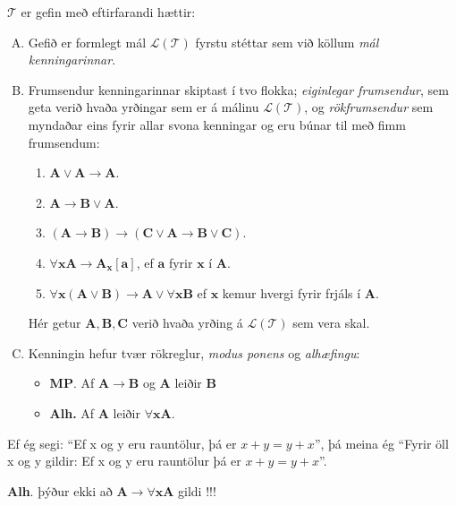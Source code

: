 \documentclass[12pt]{book}
\begin{document}
\begin{skgr} $\mathcal{T}$ er gefin með
  eftirfarandi hættir:
  \begin{enumerate}[A.]
  \item Gefið er formlegt mál $\mathcal{L(T)}$ fyrstu stéttar sem við köllum
    \emph{mál kenningarinnar}.
  \item Frumsendur kenningarinnar skiptast í tvo flokka;
    \emph{eiginlegar frumsendur}, sem geta verið hvaða yrðingar sem er á málinu
    $\mathcal{L(T)}$, og \emph{rökfrumsendur} sem myndaðar eins fyrir allar svona
    kenningar og eru búnar til með fimm frumsendum:
    \begin{enumerate}
    \item  $\mathbf{A} \vee \mathbf{A} \rightarrow \mathbf{A} $.
    \item  $ \mathbf{A} \rightarrow \mathbf{B} \vee \mathbf{A}$.
    \item  $ ( \mathbf{A} \rightarrow \mathbf{B}) \rightarrow (\mathbf{C} \vee \mathbf{A} \rightarrow \mathbf{B} \vee \mathbf{C})$.
    \item  $ \forall \mathbf{x} \mathbf{A} \rightarrow \mathbf{A}_{\mathbf{x}} [\mathbf{a}]$, ef $\mathbf{a}$
      fyrir $\mathbf{x}$  í $\mathbf{A}$.
    \item $\forall \mathbf{x} ( \mathbf{A} \vee \mathbf{B} ) \rightarrow \mathbf{A} \vee \forall \mathbf{x} \mathbf{B}$ ef $\mathbf{x}$ kemur hvergi fyrir frjáls í $\mathbf{A}$.
    \end{enumerate}

    Hér getur $\mathbf{A}, \mathbf{B}, \mathbf{C}$ verið hvaða yrðing á $\mathcal{L(T)}$
    sem vera skal.
  \item Kenningin hefur tvær rökreglur, \emph{modus ponens} og \emph{alhæfingu}:
    \begin{itemize}
    \item \textbf{MP}. Af $\mathbf{A} \rightarrow \mathbf{B}$ og $\mathbf{A}$ leiðir $\mathbf{B}$
    \item \textbf{Alh.} Af $\mathbf{A}$ leiðir $\forall \mathbf{x} \mathbf{A}$.
    \end{itemize}
  \end{enumerate}
\end{skgr}

\begin{ath}
  Ef ég segi: ``Ef x og y eru rauntölur, þá er $x + y = y+x$'', þá meina ég
  ``Fyrir öll x og y gildir: Ef x og y eru rauntölur þá er $x  + y = y + x$''.


  \textbf{Alh}. þýður ekki að $\mathbf{A} \rightarrow \forall \mathbf{x} \mathbf{A}$ gildi !!!
\end{ath}
\end{document}
